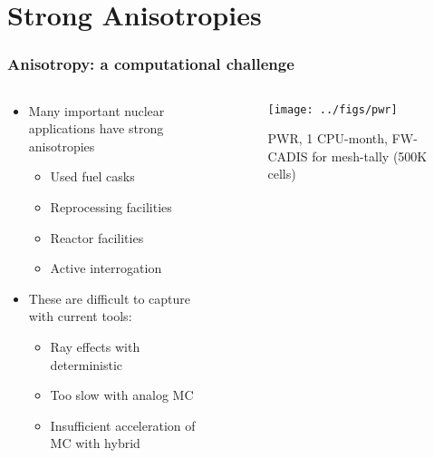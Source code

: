 \documentclass[xcolor=x11names,compress]{beamer}
\renewcommand{\(}{\begin{columns}}
\renewcommand{\)}{\end{columns}}
\newcommand{\<}[1]{\begin{column}{#1}}
\renewcommand{\>}{\end{column}}
\begin{document}
\section{Strong Anisotropies}
\begin{frame}[fragile]
  \frametitle{Anisotropy: a computational challenge}

	\begin{columns}
  	\begin{column}{0.5\textwidth}
	\begin{itemize}
	\item Many important nuclear applications have strong anisotropies
	 \begin{itemize}
	 \item Used fuel casks
	 \item Reprocessing facilities
	 \item Reactor facilities
	 \item Active interrogation 
	 \end{itemize}
	\pause
	\item These are difficult to capture with current tools:
	 \begin{itemize}
	 \item Ray effects with deterministic
	 \item Too slow with analog MC
	 \item Insufficient acceleration of MC with hybrid
	 \end{itemize}
	\end{itemize}
  	\end{column}
 	\begin{column}{0.5\textwidth}
 	 \begin{center}
 	 \begin{figure}
 	 \texttt{[image: ../figs/pwr]}  
 	 \caption{PWR, 1 CPU-month, FW-CADIS  for mesh-tally (500K cells)}
 	 \end{figure}
 	 \end{center}

  	\end{column}
	\end{columns}

\end{frame}
\end{document}
